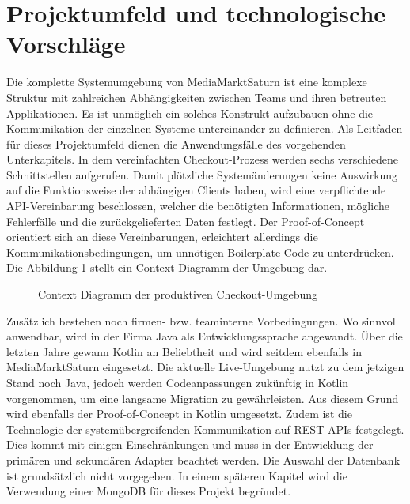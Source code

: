 \section{Projektumfeld und technologische Vorschläge}

Die komplette Systemumgebung von MediaMarktSaturn ist eine komplexe Struktur mit zahlreichen Abhängigkeiten zwischen Teams und ihren betreuten Applikationen. Es ist unmöglich ein solches Konstrukt aufzubauen ohne die Kommunikation der einzelnen Systeme untereinander zu definieren. Als Leitfaden für dieses Projektumfeld dienen die Anwendungsfälle des vorgehenden Unterkapitels. In dem vereinfachten Checkout-Prozess werden sechs verschiedene Schnittstellen aufgerufen. Damit plötzliche Systemänderungen keine Auswirkung auf die Funktionsweise der abhängigen Clients haben, wird eine verpflichtende API-Vereinbarung beschlossen, welcher die benötigten Informationen, mögliche Fehlerfälle und die zurückgelieferten Daten festlegt. Der Proof-of-Concept orientiert sich an diese Vereinbarungen, erleichtert allerdings die Kommunikationsbedingungen, um unnötigen \Gls{Boilerplate-Code} zu unterdrücken. Die Abbildung \ref{fig:ContextDiagramm} stellt ein Context-Diagramm der Umgebung dar.

\begin{figure}[htbp]
	\centering
	
	\caption{Context Diagramm der produktiven Checkout-Umgebung}
	\label{fig:ContextDiagramm}
\end{figure}

Zusätzlich bestehen noch firmen- bzw. teaminterne Vorbedingungen. Wo sinnvoll anwendbar, wird in der Firma Java als Entwicklungssprache angewandt. Über die letzten Jahre gewann Kotlin an Beliebtheit und wird seitdem ebenfalls in MediaMarktSaturn eingesetzt. Die aktuelle Live-Umgebung nutzt zu dem jetzigen Stand noch Java, jedoch werden Codeanpassungen zukünftig in Kotlin vorgenommen, um eine langsame Migration zu gewährleisten. Aus diesem Grund wird ebenfalls der Proof-of-Concept in Kotlin umgesetzt. Zudem ist die Technologie der systemübergreifenden Kommunikation auf REST-APIs festgelegt. Dies kommt mit einigen Einschränkungen und muss in der Entwicklung der primären und sekundären Adapter beachtet werden. Die Auswahl der Datenbank ist grundsätzlich nicht vorgegeben. In einem späteren Kapitel wird die Verwendung einer MongoDB für dieses Projekt begründet.
